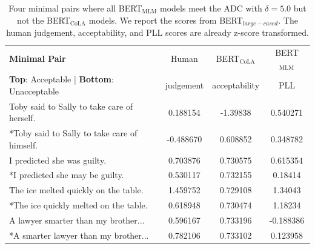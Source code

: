 \begin{table}[h]
    \centering
    \begin{tabular}{@{}lccc@{}}
    \toprule
    \textbf{Minimal Pair}                                    & Human & BERT$_{\mathrm{CoLA}}$   & BERT$_{\mathrm{MLM}}$\\
    \textbf{Top}: Acceptable | \textbf{Bottom}: Unacceptable & judgement & acceptability      & PLL\\
    \toprule
    Toby said to Sally to take care of herself.  & 0.188154 & -1.39838
 & 0.540271 \\
    *Toby said to Sally to take care of himself. & -0.488670 & 0.608852 & 0.348782 \\
    \midrule
    I predicted she was guilty.  & 0.703876 & 0.730575 & 0.615354 \\
    *I predicted she may be guilty.	 & 0.530117 &  0.732155 & 0.18414 \\
    \midrule
    The ice melted quickly on the table. & 1.459752	 & 0.729108 & 1.34043 \\
    *The ice quickly melted on the table. & 0.618948 & 0.730474 & 1.18234 \\
    \midrule
    A lawyer smarter than my brother...  & 0.596167 & 0.733196 & -0.188386 \\
    *A smarter lawyer than my brother... & 0.782106 & 0.733102 & 0.123958 \\
    \bottomrule
    \end{tabular}
    \caption[Four minimal pairs where BERT$_{\mathrm{MLM}}$ meets ADC\newline with $\delta=5.0$ but BERT$_{\mathrm{MLM}}$ does not]{Four minimal pairs where all BERT$_{\mathrm{MLM}}$ models meet the ADC with $\delta=5.0$ but not the BERT$_{\mathrm{CoLA}}$ models. We report the scores from BERT$_{large-cased}$. The human judgement, acceptability, and PLL scores are already z-score transformed. }
    \label{tab:table_19}
\end{table}
\clearpage

